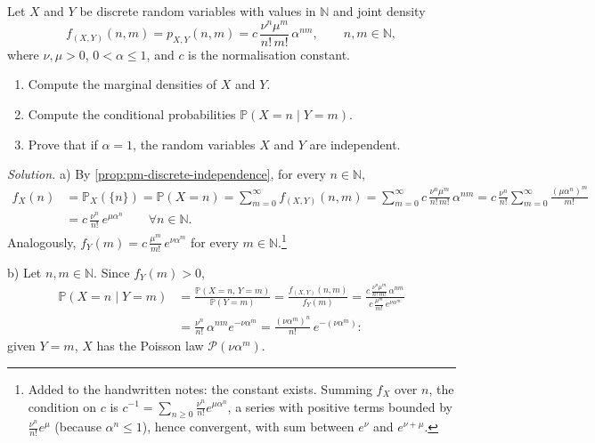 \begin{example}\label{exa:tr-poisson-joint}
Let $X$ and $Y$ be discrete random variables with values in $\mathbb N$ and joint density
\[
  f_{(X,Y)}(n,m)=p_{X,Y}(n,m)=c\,\frac{\nu^n\mu^m}{n!\,m!}\,\alpha^{nm},\qquad n,m\in\mathbb N,
\]
where $\nu,\mu>0$, $0<\alpha\le1$, and $c$ is the normalisation constant.
\begin{enumerate}[label=\alph*)]
  \item Compute the marginal densities of $X$ and $Y$.
  \item Compute the conditional probabilities $\mathbb P(X=n\mid Y=m)$.
  \item Prove that if $\alpha=1$, the random variables $X$ and $Y$ are independent.
\end{enumerate}
\emph{Solution.} a) By \cref{prop:pm-discrete-independence}, for every $n\in\mathbb N$,
\[
\begin{aligned}
  f_X(n)&=\mathbb P_X(\{n\})=\mathbb P(X=n)=\sum_{m=0}^{\infty}f_{(X,Y)}(n,m)
  =\sum_{m=0}^{\infty}c\,\frac{\nu^n\mu^m}{n!\,m!}\,\alpha^{nm}
  =c\,\frac{\nu^n}{n!}\sum_{m=0}^{\infty}\frac{(\mu\alpha^n)^m}{m!}\\
  &=c\,\frac{\nu^n}{n!}\,e^{\mu\alpha^n}\qquad\forall n\in\mathbb N .
\end{aligned}
\]
Analogously, $f_Y(m)=c\,\frac{\mu^m}{m!}\,e^{\nu\alpha^m}$ for every $m\in\mathbb N$.\footnote{Added
to the handwritten notes: the constant exists. Summing $f_X$ over $n$, the condition on $c$ is
$c^{-1}=\sum_{n\ge0}\frac{\nu^n}{n!}e^{\mu\alpha^n}$, a series with positive terms bounded by
$\frac{\nu^n}{n!}e^\mu$ (because $\alpha^n\le1$), hence convergent, with sum between $e^\nu$ and
$e^{\nu+\mu}$.}

b) Let $n,m\in\mathbb N$. Since $f_Y(m)>0$,
\[
\begin{aligned}
  \mathbb P(X=n\mid Y=m)&=\frac{\mathbb P(X=n,\,Y=m)}{\mathbb P(Y=m)}=\frac{f_{(X,Y)}(n,m)}{f_Y(m)}
  =\frac{c\,\frac{\nu^n\mu^m}{n!\,m!}\,\alpha^{nm}}{c\,\frac{\mu^m}{m!}\,e^{\nu\alpha^m}}\\
  &=\frac{\nu^n}{n!}\,\alpha^{nm}e^{-\nu\alpha^m}=\frac{(\nu\alpha^m)^n}{n!}\,e^{-(\nu\alpha^m)} :
\end{aligned}
\]
given $Y=m$, $X$ has the Poisson law $\mathcal P(\nu\alpha^m)$.


\end{example}
